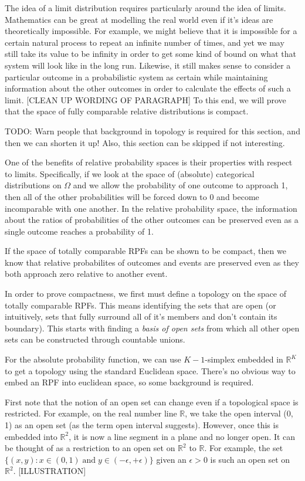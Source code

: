 \documentclass[twoside]{article}
\begin{document}
The idea of a limit distribution requires particularly around the idea of limits. Mathematics can be great at modelling the real world even if it's ideas are theoretically impossible. For example, we might believe that it is impossible for a certain natural process to repeat an infinite number of times, and yet we may still take its value to be infinity in order to get some kind of bound on what that system will look like in the long run. Likewise, it still makes sense to consider a particular outcome in a probabilistic system as certain while maintaining information about the other outcomes in order to calculate the effects of such a limit. [CLEAN UP WORDING OF PARAGRAPH] To this end, we will prove that the space of fully comparable relative distributions is compact.

TODO: Warn people that background in topology is required for this section, and then we can shorten it up! Also, this section can be skipped if not interesting.

One of the benefits of relative probability spaces is their properties with respect to limits. Specifically, if we look at the space of (absolute) categorical distributions on \(\Omega\) and we allow the probability of one outcome to approach 1, then all of the other probabilities will be forced down to 0 and become incomparable with one another. In the relative probability space, the information about the ratios of probabilities of the other outcomes can be preserved even as a single outcome reaches a probability of 1.

If the space of totally comparable RPFs can be shown to be compact, then we know that relative probabilites of outcomes and events are preserved even as they both approach zero relative to another event.

In order to prove compactness, we first must define a topology on the space of totally comparable RPFs. This means identifying the sets that are open (or intuitively, sets that fully surround all of it's members and don't contain its boundary). This starts with finding a \textit{basis of open sets} from which all other open sets can be constructed through countable unions.

For the absolute probability function, we can use \(K-1\)-simplex embedded in \(\mathbb{R}^K\) to get a topology using the standard Euclidean space. There's no obvious way to embed an RPF into euclidean space, so some background is required.

First note that the notion of an open set can change even if a topological space is restricted. For example, on the real number line \(\mathbb{R}\), we take the open interval (0, 1) as an open set (as the term open interval suggests). However, once this is embedded into \(\mathbb{R}^2\), it is now a line segment in a plane and no longer open. It can be thought of as a restriction to an open set on \(\mathbb{R}^2\) to \(\mathbb{R}\). For example, the set \(\{(x, y): x \in (0, 1)\;  \text{and}\;  y \in (-\epsilon, +\epsilon)\}\) given an \(\epsilon > 0\) is such an open set on \(\mathbb{R}^2\). [ILLUSTRATION]
\end{document}
